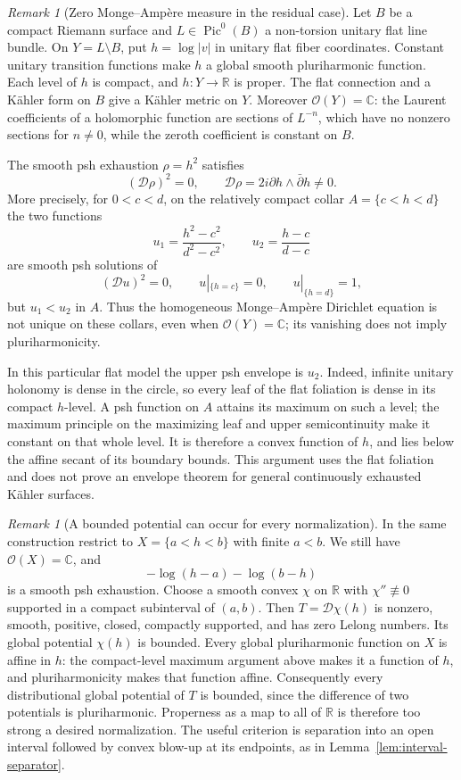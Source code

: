 \documentclass[11pt]{article}
\theoremstyle{remark}
\newtheorem{remark}[theorem]{Remark}
\newcommand{\D}{\mathcal D}
\begin{document}
\begin{remark}[Zero Monge--Amp\`ere measure in the residual case]
\label{rem:flat-envelope}
Let $B$ be a compact Riemann surface and $L\in\operatorname{Pic}^0(B)$
a non-torsion unitary flat line bundle. On $Y=L\setminus B$, put
$h=\log|v|$ in unitary flat fiber coordinates. Constant unitary
transition functions make $h$ a global smooth pluriharmonic function.
Each level of $h$ is compact, and $h:Y\to\mathbb R$ is proper.
The flat connection and a K\"ahler form on $B$ give a K\"ahler
metric on $Y$. Moreover $\mathcal O(Y)=\mathbb C$: the Laurent
coefficients of a holomorphic function are sections of $L^{-n}$,
which have no nonzero sections for $n\ne0$, while the zeroth
coefficient is constant on $B$.

The smooth psh exhaustion $\rho=h^2$ satisfies
\[
 (\D\rho)^2=0,
 \qquad \D\rho=2i\partial h\wedge\bar\partial h\ne0.
\]
More precisely, for $0<c<d$, on the relatively compact collar
$A=\{c<h<d\}$ the two functions
\[
 u_1=\frac{h^2-c^2}{d^2-c^2},
 \qquad u_2=\frac{h-c}{d-c}
\]
are smooth psh solutions of
\[
 (\D u)^2=0,\qquad u|_{\{h=c\}}=0,
 \qquad u|_{\{h=d\}}=1,
\]
but $u_1<u_2$ in $A$. Thus the homogeneous Monge--Amp\`ere
Dirichlet equation is not unique on these collars, even when
$\mathcal O(Y)=\mathbb C$; its vanishing does not imply
pluriharmonicity.

In this particular flat model the upper psh envelope is $u_2$.
Indeed, infinite unitary holonomy is dense in the circle, so every
leaf of the flat foliation is dense in its compact $h$-level.
A psh function on $A$ attains its maximum on such a level;
the maximum principle on the maximizing leaf and upper
semicontinuity make it constant on that whole level. It is
therefore a convex function of $h$, and lies below the affine
secant of its boundary bounds. This argument uses the flat
foliation and does not prove an envelope theorem for general
continuously exhausted K\"ahler surfaces.
\end{remark}

\begin{remark}[A bounded potential can occur for every normalization]
\label{rem:bounded-flat-potential}
In the same construction restrict to $X=\{a<h<b\}$ with finite
$a<b$. We still have $\mathcal O(X)=\mathbb C$, and
\[
 -\log(h-a)-\log(b-h)
\]
is a smooth psh exhaustion. Choose a smooth convex $\chi$ on
$\mathbb R$ with $\chi''\not\equiv0$ supported in a compact
subinterval of $(a,b)$. Then $T=\D\chi(h)$ is nonzero, smooth,
positive, closed, compactly supported, and has zero Lelong numbers.
Its global potential $\chi(h)$ is bounded. Every global
pluriharmonic function on $X$ is affine in $h$: the compact-level
maximum argument above makes it a function of $h$, and
pluriharmonicity makes that function affine. Consequently every
distributional global potential of $T$ is bounded, since the
difference of two potentials is pluriharmonic. Properness as a
map to all of $\mathbb R$ is therefore too strong a desired
normalization. The useful criterion is separation into an open
interval followed by convex blow-up at its endpoints, as in
Lemma~\ref{lem:interval-separator}.
\end{remark}
\end{document}

